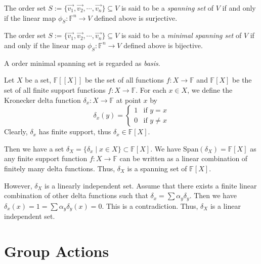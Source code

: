 \documentclass[
	11pt, %
	fleqn, %
	a4paper, %
]{LegrandOrangeBook}
\renewcommand{\span}[1]{\text{Span}(#1)} %
\newcommand{\F}{\mathbb{F}} %
\begin{document}
\begin{proposition}
    The order set $S := \{\vec{v_1}, \vec{v_2}, \cdots, \vec{v_n}\} \subseteq V$ is said to be a \emph{spanning set} of $V$ if and only if the linear map $\phi_S: \F^n \to V$ defined above is surjective.
\end{proposition}

\begin{proposition} \label{prop:minimal_spanning_set}
    The order set $S := \{\vec{v_1}, \vec{v_2}, \cdots, \vec{v_n}\} \subseteq V$ is said to be a \emph{minimal spanning set} of $V$ if and only if the linear map $\phi_S: \F^n \to V$ defined above is bijective.
\end{proposition}

\begin{remark}
    A order minimal spanning set is regarded as \emph{basis}.
\end{remark}

\begin{example}
    Let $X$ be a set, $\F[[X]]$ be the set of all functions $f: X \to \F$ and $\F[X]$ be the set of all finite support functions $f: X \to \F$. For each $x \in X$, we define the Kronecker delta function $\delta_x : X \to \F$ at point $x$ by 
    \[
        \delta_x(y) = \begin{cases}
            1 & \text{if } y = x \\
            0 & \text{if } y \neq x
        \end{cases}
    \]
    Clearly, $\delta_x$ has finite support, thus $\delta_x \in \F[X]$.

    Then we have a set $\delta_X = \{\delta_x \mid x \in X\} \subset \F[X]$. We have $\span{\delta_X} = \F[X]$ as any finite support function $f: X \to \F$ can be written as a linear combination of finitely many delta functions. Thus, $\delta_X$ is a spanning set of $\F[X]$.

    However, $\delta_X$ is a linearly independent set. Assume that there exists a finite linear combination of other delta functions such that $\delta_x = \sum \alpha_y \delta_{y}$. Then we have $\delta_x(x) = 1 = \sum \alpha_y \delta_y(x) = 0$. This is a contradiction. Thus, $\delta_X$ is a linear independent set.
\end{example}

\newpage

\section{Group Actions}
\end{document}
